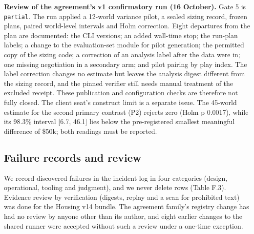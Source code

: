 \textbf{Review of the agreement's v1 confirmatory run (16 October).} Gate 5 is \texttt{partial}. The run applied a 12-world
variance pilot, a sealed sizing record, frozen plans, paired world-level intervals and Holm correction. Eight
departures from the plan are documented: the CLI versions; an added wall-time stop; the run-plan labels; a change to
the evaluation-set module for pilot generation; the permitted copy of the sizing code; a correction of an analysis
label after the data were in; one missing negotiation in a secondary arm; and pilot pairing by play index. The label
correction changes no estimate but leaves the analysis digest different from the sizing record, and the pinned
verifier still needs manual treatment of the excluded receipt. These publication and configuration checks are
therefore not fully closed. The client seat's construct limit is a separate issue. The 45-world estimate for the
second primary contrast (P2) rejects zero (Holm p 0.0017), while its 98.3\% interval {[}6.7, 46.1{]} lies below the
pre-registered smallest meaningful difference of \$50k; both readings must be reported.

\subsection{Failure records and review}\label{failure-records-and-review}

We record discovered failures in the incident log in four categories (design, operational, tooling and judgment),
and we never delete rows (Table F.3). Evidence review by verification (digests, replay and a scan for prohibited text)
was done for the Housing v14 bundle. The agreement family's registry change has had no review by anyone other than its
author, and eight earlier changes to the shared runner were accepted without such a review under a one-time
exception.

